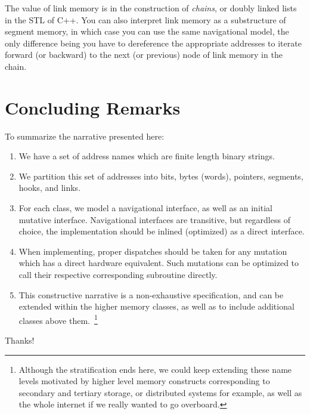 \documentclass[twoside]{article}
\begin{document}
The value of link memory is in the construction of \emph{chains}, or doubly linked lists in the STL of C++.
You can also interpret link memory as a substructure of segment memory, in which case you can use the same navigational
model, the only difference being you have to dereference the appropriate addresses to iterate forward (or backward)
to the next (or previous) node of link memory in the chain.

\section*{Concluding Remarks}

To summarize the narrative presented here:

\begin{enumerate}
\item We have a set of address names which are finite length binary strings.
\item We partition this set of addresses into bits, bytes (words), pointers, segments, hooks, and links.
\item For each class, we model a navigational interface, as well as an initial mutative interface. Navigational
      interfaces are transitive, but regardless of choice, the implementation should be inlined (optimized)
      as a direct interface.
\item When implementing, proper dispatches should be taken for any mutation which has a direct hardware equivalent.
      Such mutations can be optimized to call their respective corresponding subroutine directly.
\item This constructive narrative is a non-exhaustive specification, and can be extended within the higher
      memory classes, as well as to include additional classes above them.~\footnote{Although the stratification
      ends here, we could keep extending these name levels motivated by higher level memory constructs corresponding
      to secondary and tertiary storage, or distributed systems for example, as well as the whole internet if we
      really wanted to go overboard.}
\end{enumerate}

Thanks!
\end{document}
